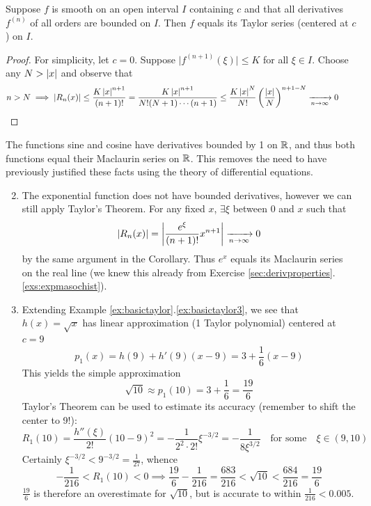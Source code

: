 \begin{cor}{}{}
	Suppose $f$ is smooth on an open interval $I$ containing $c$ and that all derivatives $f^{(n)}$ of all orders are bounded on $I$. Then $f$ equals its Taylor series (centered at $c$) on $I$.
\end{cor}

\begin{proof}
	For simplicity, let $c=0$. Suppose $\bigl|f^{(n+1)}(\xi)\bigr|\le K$ for all $\xi\in I$. Choose any $N>\left| x\right|$ and observe that
	\[
		n>N \implies\left| R_n(x)\right|\le\frac{K\left| x\right|^{n+1}}{(n+1)!} 
		=\frac{K\left| x\right|^{n+1}}{N!(N+1)\cdots(n+1)}
		\le\frac{K\left| x\right|^{N}}{N!}\left(\frac{\left| x\right|}{N}\right)^{n+1-N}
		\xrightarrow[n\to\infty]{} 0
		\tag*{\qedhere}
	\]
\end{proof}



\goodbreak


\begin{examples}{}{}
	\exstart The functions sine and cosine have derivatives bounded by 1 on $\mathbb{R}$, and thus both functions equal their Maclaurin series on $\mathbb{R}$. This removes the need to have previously justified these facts using the theory of differential equations.
	\begin{enumerate}\setcounter{enumi}{1}
		\item The exponential function does not have bounded derivatives, however we can still apply Taylor's Theorem. For any fixed $x$, $\exists\xi$ between $0$ and $x$ such that
		\[
			\left| R_n(x)\right|=\left| \frac{e^\xi}{(n+1)!}x^{n+1}\right|
			\xrightarrow[n\to\infty]{} 0
		\]
		by the same argument in the Corollary. Thus $e^x$ equals its Maclaurin series on the real line (we knew this already from Exercise \ref{sec:derivproperties}.\ref{exs:expmasochist}).
		
		\item Extending Example \ref*{ex:basictaylor}.\ref*{ex:basictaylor3}, we see that $h(x)=\sqrt x$ has linear approximation (1\st{} Taylor polynomial) centered at $c=9$
		\[
			p_1(x)=h(9)+h'(9)(x-9)=3+\frac 16(x-9)
		\]
		This yields the simple approximation
		\[
			\sqrt{10}\approx p_1(10)= 3+\frac 16=\frac{19}6
		\]
		Taylor's Theorem can be used to estimate its accuracy (remember to shift the center to 9!):
		\[
			R_1(10)=\frac{h''(\xi)}{2!}(10-9)^2
			=-\frac{1}{2^2\cdot 2!}\xi^{-3/2} 
			=-\frac 1{8\xi^{3/2}}
			\quad\text{for some}\quad 
			\xi\in(9,10)
		\]
		Certainly $\xi^{-3/2}<9^{-3/2}=\frac 1{27}$, whence
		\[
			-\frac 1{216}<R_1(10)<0
			\implies \frac{19}6-\frac 1{216}
			=\frac{683}{216}<\sqrt{10}<\frac{684}{216}
			=\frac{19}6
		\]
		$\frac{19}6$ is therefore an overestimate for $\sqrt{10}$, but is accurate to within $\frac 1{216}<0.005$.
	\end{enumerate}
\end{examples}

